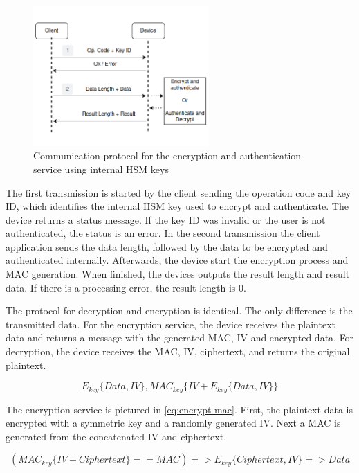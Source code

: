 \begin{figure}[h!]
	\centering
	\includegraphics[width=0.60\textwidth]{./Images/data-exchange.png}
	\caption{Communication protocol for the encryption and authentication service using internal HSM keys}
	\label{fig:protocol:data-exchange}
\end{figure}

The first transmission is started by the client sending the operation code and key ID, which identifies the internal \ac{HSM} key used to encrypt and authenticate.
The device returns a status message. If the key ID was invalid or the user is not authenticated, the status is an error.
In the second transmission the client application sends the data length, followed by the data to be encrypted and authenticated internally.
Afterwards, the device start the encryption process and \ac{MAC} generation. When finished, the devices outputs the result length and result data. If there is a processing error, the result length is 0.

The protocol for decryption and encryption is identical. The only difference is the transmitted data. For the encryption service, the device receives the plaintext data and returns a message with the generated \ac{MAC}, \ac{IV} and encrypted data. For decryption, the device receives the \ac{MAC}, \ac{IV}, ciphertext, and returns the original plaintext.

\begin{equation}
	\label{eq:encrypt-mac}
	E_{key}\{Data, IV\}, MAC_{key}\{IV+E_{key}\{Data, IV\}\}
\end{equation}

The encryption service is pictured in \ref{eq:encrypt-mac}.
First, the plaintext data is encrypted with a symmetric key and a randomly generated \ac{IV}. Next a \ac{MAC} is generated from the concatenated \ac{IV} and ciphertext.


\begin{equation}
	\label{eq:decrypt-mac}
	(MAC_{key}\{IV+Ciphertext\} == MAC) => E_{key}\{Ciphertext, IV\} => Data
\end{equation}


